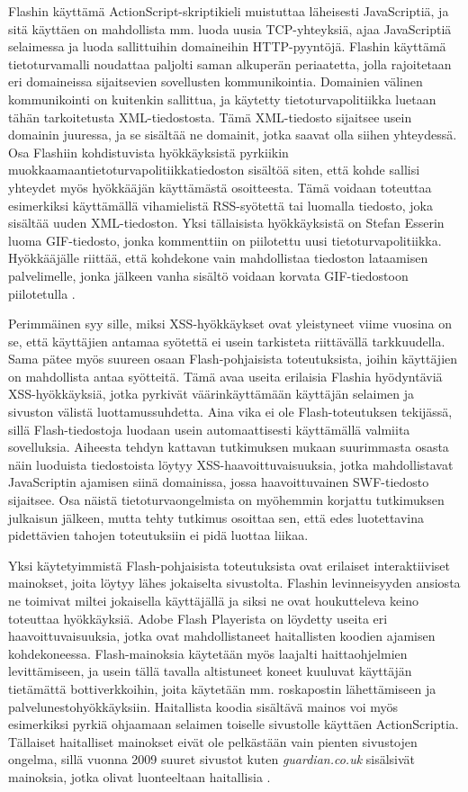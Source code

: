 Flashin käyttämä ActionScript-skriptikieli muistuttaa läheisesti JavaScriptiä, ja sitä käyttäen on mahdollista mm. luoda uusia TCP-yhteyksiä, ajaa JavaScriptiä selaimessa ja luoda 
sallittuihin domaineihin HTTP-pyyntöjä. Flashin käyttämä tietoturvamalli noudattaa paljolti saman alkuperän periaatetta, jolla rajoitetaan eri domaineissa sijaitsevien sovellusten 
kommunikointia. Domainien välinen kommunikointi on kuitenkin sallittua, ja käytetty tietoturvapolitiikka luetaan tähän tarkoitetusta XML-tiedostosta. Tämä XML-tiedosto sijaitsee usein 
domainin juuressa, ja se sisältää ne domainit, jotka saavat olla siihen yhteydessä. Osa Flashiin kohdistuvista hyökkäyksistä pyrkiikin muokkaamaantietoturvapolitiikkatiedoston sisältöä
siten, että kohde sallisi yhteydet myös hyökkääjän käyttämästä osoitteesta. Tämä voidaan toteuttaa esimerkiksi käyttämällä vihamielistä RSS-syötettä tai luomalla tiedosto, joka sisältää
uuden XML-tiedoston. Yksi tällaisista hyökkäyksistä on Stefan Esserin luoma GIF-tiedosto, jonka kommenttiin on piilotettu uusi tietoturvapolitiikka. Hyökkääjälle riittää, että kohdekone 
vain mahdollistaa tiedoston lataamisen palvelimelle, jonka jälkeen vanha sisältö voidaan korvata GIF-tiedostoon piilotetulla \cite{WEB2}.

Perimmäinen syy sille, miksi XSS-hyökkäykset ovat yleistyneet viime vuosina on se, että käyttäjien antamaa syötettä ei usein tarkisteta riittävällä tarkkuudella. Sama pätee myös suureen 
osaan Flash-pohjaisista toteutuksista, joihin käyttäjien on mahdollista antaa syötteitä. Tämä avaa useita erilaisia Flashia hyödyntäviä XSS-hyökkäyksiä, jotka pyrkivät väärinkäyttämään 
käyttäjän selaimen ja sivuston välistä luottamussuhdetta. Aina vika ei ole Flash-toteutuksen tekijässä, sillä Flash-tiedostoja luodaan usein automaattisesti käyttämällä valmiita 
sovelluksia. Aiheesta tehdyn kattavan tutkimuksen mukaan \cite{FlashXSS} suurimmasta osasta näin luoduista tiedostoista löytyy XSS-haavoittuvaisuuksia, jotka mahdollistavat JavaScriptin
ajamisen siinä domainissa, jossa haavoittuvainen SWF-tiedosto sijaitsee. Osa näistä tietoturvaongelmista on myöhemmin korjattu tutkimuksen julkaisun jälkeen, mutta tehty tutkimus osoittaa 
sen, että edes luotettavina pidettävien tahojen toteutuksiin ei pidä luottaa liikaa.

Yksi käytetyimmistä Flash-pohjaisista toteutuksista ovat erilaiset interaktiiviset mainokset, joita löytyy lähes jokaiselta sivustolta. Flashin levinneisyyden ansiosta ne toimivat miltei
jokaisella käyttäjällä ja siksi ne ovat houkutteleva keino toteuttaa hyökkäyksiä. Adobe Flash Playerista on löydetty useita eri haavoittuvaisuuksia, jotka ovat mahdollistaneet haitallisten
koodien ajamisen kohdekoneessa. Flash-mainoksia käytetään myös laajalti haittaohjelmien levittämiseen, ja usein tällä tavalla altistuneet koneet kuuluvat käyttäjän tietämättä 
bottiverkkoihin, joita käytetään mm. roskapostin lähettämiseen ja palvelunestohyökkäyksiin. Haitallista koodia sisältävä mainos voi myös esimerkiksi pyrkiä ohjaamaan selaimen toiselle 
sivustolle käyttäen ActionScriptia.  Tällaiset haitalliset mainokset eivät ole pelkästään vain pienten sivustojen ongelma, sillä vuonna 2009 suuret sivustot kuten \emph{guardian.co.uk} 
sisälsivät mainoksia, jotka olivat luonteeltaan haitallisia \cite{FlashAdd}.

